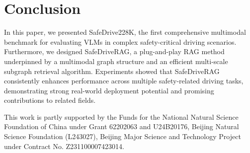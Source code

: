 \documentclass[sigconf]{acmart}
\begin{document}
\section{Conclusion}

In this paper, we presented SafeDrive228K, the first comprehensive multimodal benchmark for evaluating VLMs in complex safety-critical driving scenarios. Furthermore, we designed SafeDriveRAG, a plug-and-play RAG method underpinned by a multimodal graph structure and an efficient multi-scale subgraph retrieval algorithm. Experiments showed that SafeDriveRAG consistently enhances performance across multiple safety-related driving tasks, demonstrating strong real-world deployment potential and promising contributions to related fields.

\begin{acks}
This work is partly supported by the Funds for the National Natural Science Foundation of China under Grant 62202063 and U24B20176, Beijing Natural Science Foundation (L243027), Beijing Major Science and Technology Project under Contract No. Z231100007423014.
\end{acks}






\appendix
\end{document}
